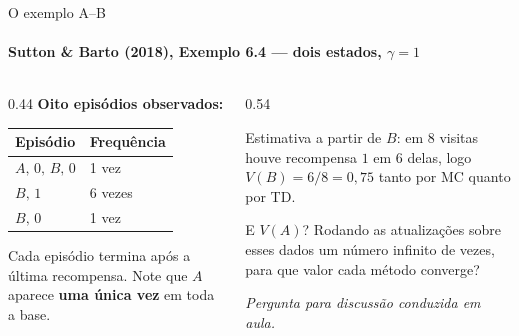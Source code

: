 \documentclass[aspectratio=169, 11pt]{beamer}
\newcommand{\paradiscussao}{\smallskip
  {\footnotesize\color{rlCinza}\itshape Pergunta para discussão conduzida em aula.}}
\begin{document}
\begin{frame}{O exemplo A--B}
  \framesubtitle{Sutton \& Barto (2018), Exemplo 6.4 — dois estados, $\gamma = 1$}

  \begin{columns}[T]
    \begin{column}{0.44\textwidth}
      \textbf{Oito episódios observados:}
      \smallskip

      {\small
      \begin{tabular}{ll}
        \toprule
        Episódio & Frequência \\
        \midrule
        $A,\,0,\,B,\,0$ & 1 vez \\
        $B,\,1$         & 6 vezes \\
        $B,\,0$         & 1 vez \\
        \bottomrule
      \end{tabular}}

      \medskip
      {\small Cada episódio termina após a última recompensa. Note que
      $A$ aparece \textbf{uma única vez} em toda a base.}
    \end{column}
    \begin{column}{0.54\textwidth}
      \begin{defbox}{}
        Estimativa a partir de $B$: em $8$ visitas houve recompensa $1$ em
        $6$ delas, logo $V(B) = 6/8 = 0{,}75$ tanto por MC quanto por TD.
      \end{defbox}

      \begin{quizbox}{}
        E $V(A)$? Rodando as atualizações sobre esses dados um número
        infinito de vezes, para que valor cada método converge?
      \end{quizbox}
      \paradiscussao
    \end{column}
  \end{columns}
\end{frame}
\end{document}
